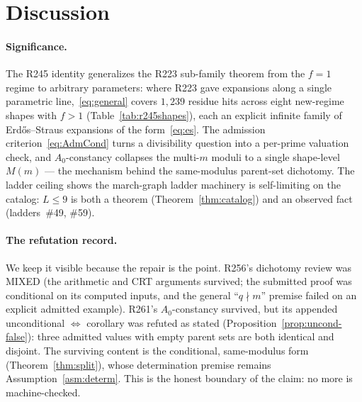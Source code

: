 \documentclass[11pt,a4paper]{article}
\theoremstyle{definition}
\begin{document}
\section{Discussion}

\paragraph{Significance.} The R245 identity generalizes the R223
sub-family theorem from the $f=1$ regime to arbitrary parameters:
where R223 gave expansions along a single parametric line,~\eqref{eq:general}
covers $1{,}239$ residue hits across eight new-regime shapes with $f>1$
(Table~\ref{tab:r245shapes}), each an explicit infinite family of
Erd\H{o}s--Straus expansions of the form~\eqref{eq:es}. The admission
criterion~\eqref{eq:AdmCond} turns a divisibility question into a
per-prime valuation check, and $A_0$-constancy collapses the
multi-$m$ moduli to a single shape-level $M(m)$ --- the mechanism behind
the same-modulus parent-set dichotomy. The ladder ceiling shows the
march-graph ladder machinery is self-limiting on the catalog:
$L\le9$ is both a theorem (Theorem~\ref{thm:catalog}) and an observed
fact (ladders~\#49, \#59).

\paragraph{The refutation record.} We keep it visible because the
repair is the point. R256's dichotomy review was MIXED (the arithmetic
and CRT arguments survived; the submitted proof was conditional on its
computed inputs, and the general ``$q\nmid m$'' premise failed on an
explicit admitted example). R261's $A_0$-constancy survived, but its
appended unconditional $\iff$ corollary was refuted as stated
(Proposition~\ref{prop:uncond-false}): three admitted values with empty
parent sets are both identical and disjoint. The surviving content is
the conditional, same-modulus form (Theorem~\ref{thm:split}), whose
determination premise remains Assumption~\ref{asm:determ}. This is the
honest boundary of the claim: no more is machine-checked.
\end{document}
